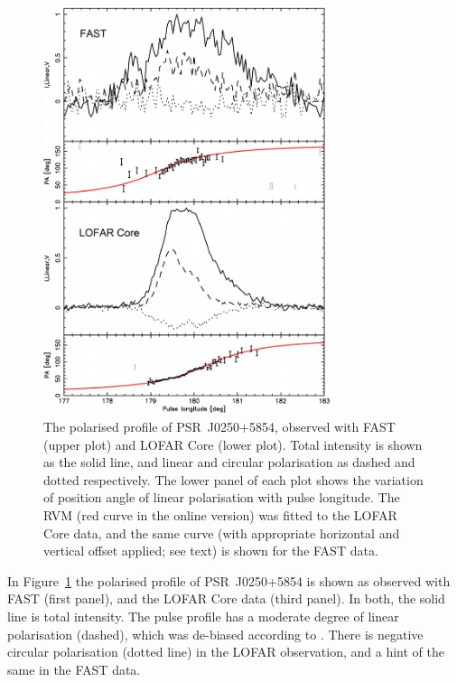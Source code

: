 \begin{figure}
    \includegraphics[width=0.75\textwidth]{Figures/J0250/polarised_profiles}
    \caption[Polarised profiles of PSR~J0250+5854]{The polarised profile of PSR~J0250+5854, observed with FAST (upper plot) and LOFAR Core (lower plot). Total intensity is shown as the solid line, and linear and circular polarisation as dashed and dotted respectively. The lower panel of each plot shows the variation of position angle of linear polarisation with pulse longitude. The RVM (red curve in the online version) was fitted to the LOFAR Core data, and the same curve (with appropriate horizontal and vertical offset applied; see text) is shown for the FAST data.}
    \label{fig: polarised profiles}
\end{figure}
   
In Figure~\ref{fig: polarised profiles} the polarised profile of PSR~J0250+5854 is shown as observed with FAST (first panel), and the LOFAR Core data (third panel). In both, the solid line is total intensity. The pulse profile has a moderate degree of linear polarisation (dashed), which was de-biased according to \citet{WKxx1974}. There is negative circular polarisation (dotted line) in the LOFAR observation, and a hint of the same in the FAST data. 

